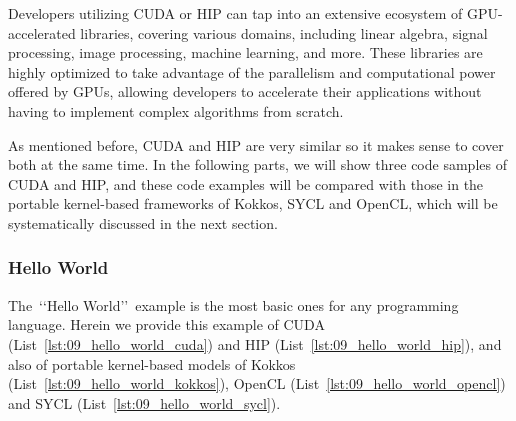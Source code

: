 \par
Developers utilizing CUDA or HIP can tap into an extensive ecosystem of GPU-accelerated libraries, covering various domains, including linear algebra, signal processing, image processing, machine learning, and more.
These libraries are highly optimized to take advantage of the parallelism and computational power offered by GPUs, allowing developers to accelerate their applications without having to implement complex algorithms from scratch.


\par
As mentioned before, CUDA and HIP are very similar so it makes sense to cover both at the same time.
In the following parts, we will show three code samples of CUDA and HIP, and these code examples will be compared with those in the portable kernel-based frameworks of Kokkos, SYCL and OpenCL, which will be systematically discussed in the next section.


\subsubsection{Hello World}


\par
The~\lq\lq Hello World\rq\rq~example is the most basic ones for any programming language.
Herein we provide this example of CUDA (List~\ref{lst:09_hello_world_cuda}) and HIP (List~\ref{lst:09_hello_world_hip}), and also of portable kernel-based models of Kokkos (List~\ref{lst:09_hello_world_kokkos}), OpenCL (List~\ref{lst:09_hello_world_opencl}) and SYCL (List~\ref{lst:09_hello_world_sycl}).














